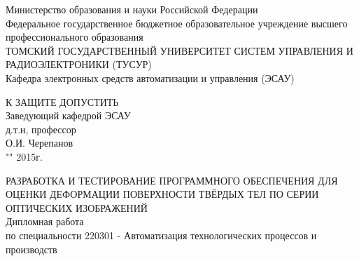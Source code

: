 \newpage
{}

\begin{center}
Министерство образования и науки Российской Федерации\\
Федеральное государственное бюджетное образовательное учреждение высшего профессионального образования\\
ТОМСКИЙ ГОСУДАРСТВЕННЫЙ УНИВЕРСИТЕТ СИСТЕМ УПРАВЛЕНИЯ И РАДИОЭЛЕКТРОНИКИ (ТУСУР)\\
Кафедра электронных средств автоматизации и управления (ЭСАУ)\\
\end{center}

\hfill
\begin{minipage}[right]{0.4\linewidth}
\begin{singlespace}
 К ЗАЩИТЕ ДОПУСТИТЬ \\
 Заведующий кафедрой ЭСАУ \\
 д.т.н, профессор \\
 \underline{\hspace{2.5cm}}О.И. Черепанов \\
 "\underline{\hspace{1cm}}"\underline{\hspace{3cm}} 2015г.\\
\end{singlespace} 
\end{minipage}


\begin{center}
РАЗРАБОТКА И ТЕСТИРОВАНИЕ ПРОГРАММНОГО ОБЕСПЕЧЕНИЯ ДЛЯ ОЦЕНКИ ДЕФОРМАЦИИ ПОВЕРХНОСТИ ТВЁРДЫХ ТЕЛ ПО СЕРИИ ОПТИЧЕСКИХ ИЗОБРАЖЕНИЙ \\
Дипломная работа \\
по специальности 220301 - Автоматизация технологических процессов и производств\\
\vspace{1.0cm}
\end{center}

